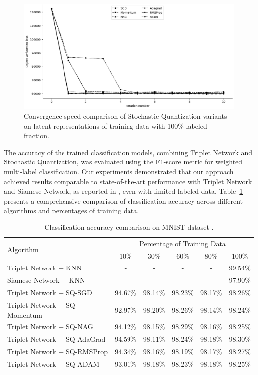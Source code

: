 \begin{figure}
    \centering
    \includegraphics[width=\textwidth]{figures/sq_convergence_full_dataset.png}
    \caption{Convergence speed comparison of Stochastic Quantization variants on latent representations of training data with 100\% labeled fraction.}
    \label{convergence:fig}
\end{figure}

The accuracy of the trained classification models, combining Triplet Network and Stochastic Quantization, was evaluated using the F1-score metric \cite{Chinchor_1992} for weighted multi-label classification. Our experiments demonstrated that our approach achieved results comparable to state-of-the-art performance with Triplet Network and Siamese Network, as reported in \cite{Hoffer_2015}, even with limited labeled data. Table~\ref{accuracy:table} presents a comprehensive comparison of classification accuracy across different algorithms and percentages of training data.

\begin{table}
\caption{Classification accuracy comparison on MNIST dataset \cite{lecun2010mnist}.}
    \label{accuracy:table}
    \begin{tabularx}{\textwidth}{|X|*{5}{c|}}
        \hline
        \multirow{2}{*}{Algorithm} & \multicolumn{5}{c|}{Percentage of Training Data} \\
        \cline{2-6}
        & 10\% & 30\% & 60\% & 80\% & 100\% \\
        \hline
        Triplet Network + KNN         & - & - & - & - & 99.54\% \\
        Siamese Network + KNN         & - & - & - & - & 97.90\% \\
        Triplet Network + SQ-SGD      & 94.67\% & 98.14\% & 98.23\% & 98.17\% & 98.26\% \\
        Triplet Network + SQ-Momentum & 92.97\% & 98.20\% & 98.26\% & 98.14\% & 98.24\% \\
        Triplet Network + SQ-NAG      & 94.12\% & 98.15\% & 98.29\% & 98.16\% & 98.25\% \\
        Triplet Network + SQ-AdaGrad  & 94.59\% & 98.11\% & 98.24\% & 98.18\% & 98.30\% \\
        Triplet Network + SQ-RMSProp  & 94.34\% & 98.16\% & 98.19\% & 98.17\% & 98.27\% \\
        Triplet Network + SQ-ADAM     & 93.01\% & 98.18\% & 98.23\% & 98.18\% & 98.25\% \\
        \hline
    \end{tabularx}
\end{table}
